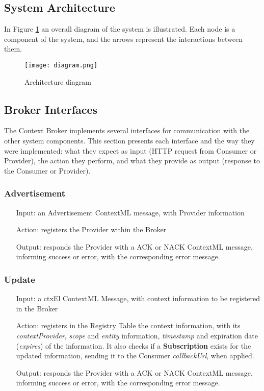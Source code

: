 \subsection{System Architecture}
In Figure \ref{fig:diagram} an overall diagram of the system is illustrated. Each node is a component of the system, and the arrows represent the interactions between them.

\begin{figure}[h]
	\centering
	\texttt{[image: diagram.png]}
	\caption{Architecture diagram}
	\label{fig:diagram}
	
\end{figure}


\subsection{Broker Interfaces}
The Context Broker implements several interfaces for communication with the other system components. This section presents each interface and the way they were implemented: what they expect as input (HTTP request from Consumer or Provider), the action they perform, and what they provide as output (response to the Consumer or Provider).


\subsubsection{Advertisement}
\begin{itemize}
	\item[Input:] an Advertisement ContextML message, with Provider information
	
	\item[Action:] registers the Provider within the Broker
	
	\item[Output:] responds the Provider with a ACK or NACK ContextML message, informing success or error, with the corresponding error message.
\end{itemize}

\subsubsection{Update}
\begin{itemize}
	\item[Input:] a ctxEl ContextML Message, with context information to be registered in the Broker
	
	\item[Action:] registers in the Registry Table the context information, with its \textit{contextProvider}, \textit{scope} and \textit{entity} information, \textit{timestamp} and expiration date (\textit{expires}) of the information. It also checks if a \textbf{Subscription} exists for the updated information, sending it to the Consumer \textit{callbackUrl}, when applied.
	
	\item[Output:] responds the Provider with a ACK or NACK ContextML message, informing success or error, with the corresponding error message.
\end{itemize}

